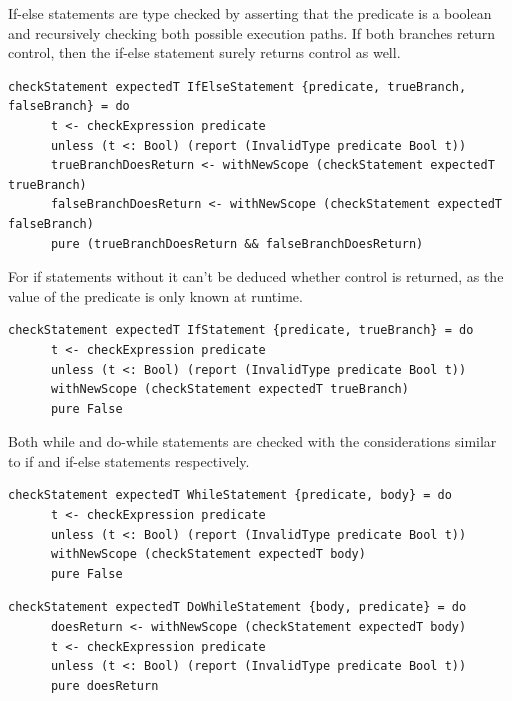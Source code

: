 \documentclass[UdineBachThesis,american,11pt]{PhdThesis}
\begin{document}
  If-else statements are type checked by asserting that the predicate is a
  boolean and recursively checking both possible execution paths. If both
  branches return control, then the if-else statement surely returns control as
  well.

  \begin{lstlisting}[gobble=4,basicstyle=\ttfamily\small]
    checkStatement expectedT IfElseStatement {predicate, trueBranch, falseBranch} = do
      t <- checkExpression predicate
      unless (t <: Bool) (report (InvalidType predicate Bool t))
      trueBranchDoesReturn <- withNewScope (checkStatement expectedT trueBranch)
      falseBranchDoesReturn <- withNewScope (checkStatement expectedT falseBranch)
      pure (trueBranchDoesReturn && falseBranchDoesReturn)
  \end{lstlisting}

  For if statements without \lstinline@else@ it can't be deduced whether control
  is returned, as the value of the predicate is only known at runtime.

  \begin{lstlisting}[gobble=4,basicstyle=\ttfamily\small]
    checkStatement expectedT IfStatement {predicate, trueBranch} = do
      t <- checkExpression predicate
      unless (t <: Bool) (report (InvalidType predicate Bool t))
      withNewScope (checkStatement expectedT trueBranch)
      pure False
  \end{lstlisting}

  Both while and do-while statements are checked with the considerations similar
  to if and if-else statements respectively.

  \begin{lstlisting}[gobble=4,basicstyle=\ttfamily\small]
    checkStatement expectedT WhileStatement {predicate, body} = do
      t <- checkExpression predicate
      unless (t <: Bool) (report (InvalidType predicate Bool t))
      withNewScope (checkStatement expectedT body)
      pure False
  \end{lstlisting}

  \newpage

  \begin{lstlisting}[gobble=4,basicstyle=\ttfamily\small]
    checkStatement expectedT DoWhileStatement {body, predicate} = do
      doesReturn <- withNewScope (checkStatement expectedT body)
      t <- checkExpression predicate
      unless (t <: Bool) (report (InvalidType predicate Bool t))
      pure doesReturn
  \end{lstlisting}
\end{document}
